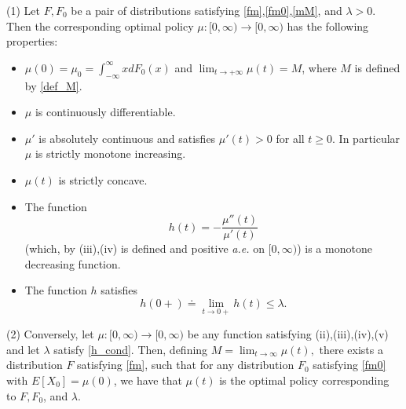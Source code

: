 \documentclass[10pt,a4paper]{amsart}
\begin{document}
	\begin{thm}\label{char}
		(1) Let $F,F_0$ be a pair of distributions satisfying \eqref{fm},\eqref{fm0},\eqref{mM}, and $\lambda>0$.
		Then the corresponding optimal policy $\mu: [0,\infty)\rightarrow [0,\infty)$ has the following properties:
		\begin{itemize}
			\item[(i)] $\mu(0)=\mu_0=\int_{-\infty}^\infty xdF_0(x)$ and  $\lim_{t\rightarrow +\infty}\mu(t)=M$, where $M$ is defined by
			\eqref{def_M}.
			
			\item[(ii)] $\mu$ is continuously differentiable.
			
			\item[(iii)] $\mu'$ is absolutely continuous and satisfies $\mu'(t)>0$ for all $t\geq 0$. In particular $\mu$ is strictly monotone increasing.
			
			\item[(iv)] $\mu(t)$ is strictly concave.
			
			\item[(v)] The function \begin{equation}\label{def_h}h(t)=-\frac{\mu''(t)}{\mu'(t)}
			\end{equation}
			(which, by (iii),(iv) is defined and positive {\it{a.e.}} on $[0,\infty)$) is a monotone decreasing function.
			
			\item[(vi)] The function $h$ satisfies
			\begin{equation}\label{h_cond}h(0+)\doteq\lim_{t\rightarrow 0+}h(t)\leq \lambda.
			\end{equation}
		\end{itemize}
		
		(2) Conversely, let $\mu:[0,\infty)\rightarrow [0,\infty)$ be any function
		satisfying (ii),(iii),(iv),(v) and let $\lambda$ satisfy \eqref{h_cond}.  Then, defining
		$M=\lim_{t\rightarrow \infty}\mu(t),$ there 
		exists a distribution $F$ satisfying 
		\eqref{fm}, such that for any distribution $F_0$ satisfying \eqref{fm0} with $E[X_0]=\mu(0)$, we have that 
		$\mu(t)$ is the optimal policy corresponding to $F,F_0$, and $\lambda$.
	\end{thm}
\end{document}
